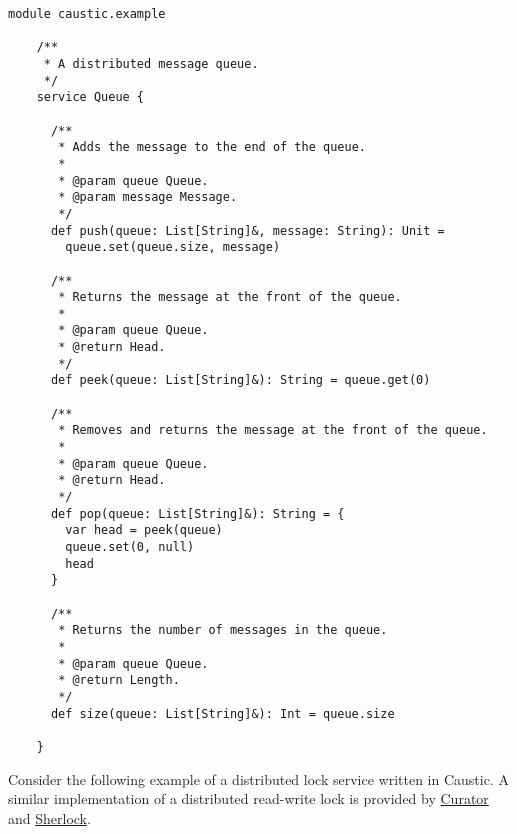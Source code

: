 \documentclass[../main.tex]{subfiles}
\begin{document}
  \begin{lstlisting}[style=Caustic]
    module caustic.example

    /**
     * A distributed message queue.
     */
    service Queue {

      /**
       * Adds the message to the end of the queue.
       *
       * @param queue Queue.
       * @param message Message.
       */
      def push(queue: List[String]&, message: String): Unit =
        queue.set(queue.size, message)

      /**
       * Returns the message at the front of the queue.
       *
       * @param queue Queue.
       * @return Head.
       */
      def peek(queue: List[String]&): String = queue.get(0)

      /**
       * Removes and returns the message at the front of the queue.
       *
       * @param queue Queue.
       * @return Head.
       */
      def pop(queue: List[String]&): String = {
        var head = peek(queue)
        queue.set(0, null)
        head
      }

      /**
       * Returns the number of messages in the queue.
       *
       * @param queue Queue.
       * @return Length.
       */
      def size(queue: List[String]&): Int = queue.size

    }
  \end{lstlisting}

  Consider the following example of a distributed lock service written in Caustic. A similar
  implementation of a distributed read-write lock is provided by
  \href{https://git.io/vpOTL}{Curator} and \href{https://git.io/vpOTq}{Sherlock}.
\end{document}

